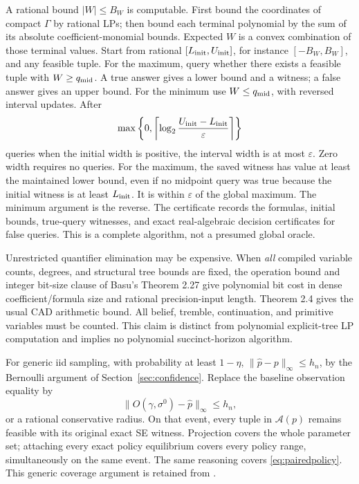 \documentclass[11pt,a4paper]{article}
\numberwithin{equation}{section}
\theoremstyle{definition}
\begin{document}
A rational bound \(|W|\le B_W\) is computable.
First bound the coordinates of compact \(\Gamma\) by rational LPs;
then bound each terminal polynomial by the sum of its absolute
coefficient-monomial bounds. Expected \(W\) is a convex combination
of those terminal values.
Start from rational \([L_{\rm init},U_{\rm init}]\), for instance
\([-B_W,B_W]\), and any feasible tuple.
For the maximum, query whether there exists a feasible tuple with
\(W\ge q_{\rm mid}\). A true answer gives a lower bound and a
witness; a false answer gives an upper bound. For the minimum use
\(W\le q_{\rm mid}\), with reversed interval updates.
After
\begin{equation}\label{eq:bisectcount}
 \max\left\{0,\left\lceil
       \log_2\frac{U_{\rm init}-L_{\rm init}}{\varepsilon}
                     \right\rceil\right\}
\end{equation}
queries when the initial width is positive, the interval width is
at most \(\varepsilon\). Zero width requires no queries.
For the maximum, the saved witness has value at least the maintained
lower bound, even if no midpoint query was true because the initial
witness is at least \(L_{\rm init}\). It is within \(\varepsilon\)
of the global maximum. The minimum argument is the reverse.
The certificate records the formulas, initial bounds, true-query
witnesses, and exact real-algebraic decision certificates for false
queries. This is a complete algorithm, not a presumed global oracle.

Unrestricted quantifier elimination may be expensive.
When \emph{all} compiled variable counts, degrees, and structural
tree bounds are fixed, the operation bound and integer bit-size clause
of Basu's Theorem 2.27 \cite[p.~16]{Basu} give polynomial bit cost
in dense coefficient/formula size and rational precision-input length.
Theorem 2.4 \cite[p.~6]{Basu} gives the usual CAD arithmetic bound.
All belief, tremble, continuation, and primitive variables must be
counted. This claim is distinct from polynomial explicit-tree LP
computation and implies no polynomial succinct-horizon algorithm.

For generic iid sampling, with probability at least \(1-\eta\),
\(\|\widehat p-p\|_\infty\le h_n\), by the Bernoulli argument
of Section~\ref{sec:confidence}. Replace the baseline observation
equality by
\[
 \|O(\gamma,\sigma^0)-\widehat p\|_\infty\le h_n,
\]
or a rational conservative radius. On that event, every tuple in
\(\mathcal A(p)\) remains feasible with its original exact SE witness.
Projection covers the whole parameter set; attaching every exact
policy equilibrium covers every policy range, simultaneously on the
same event. The same reasoning covers \eqref{eq:pairedpolicy}.
This generic coverage argument is retained from \cite{Prior}.
\end{document}
